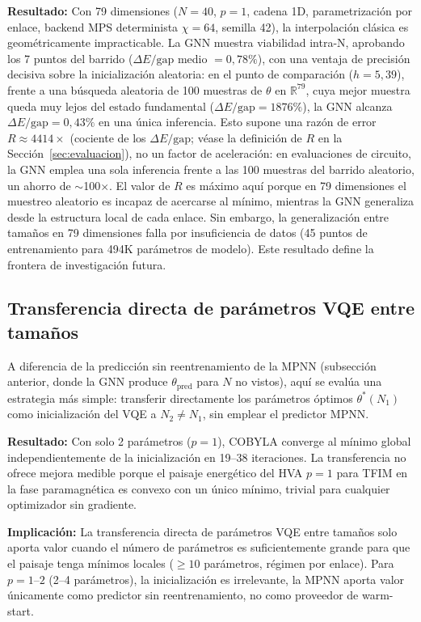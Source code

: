 \documentclass[11pt,a4paper,spanish]{book}
\begin{document}
\textbf{Resultado:} Con 79 dimensiones ($N = 40$, $p = 1$, cadena 1D, parametrización por enlace, backend MPS determinista $\chi = 64$, semilla 42), la interpolación clásica es geométricamente impracticable. La GNN muestra viabilidad intra-N, aprobando los 7 puntos del barrido ($\Delta E/\text{gap}$ medio $= 0,78\%$), con una ventaja de precisión decisiva sobre la inicialización aleatoria: en el punto de comparación ($h = 5,39$), frente a una búsqueda aleatoria de 100 muestras de $\theta$ en $\mathbb{R}^{79}$, cuya mejor muestra queda muy lejos del estado fundamental ($\Delta E/\text{gap} = 1876\%$), la GNN alcanza $\Delta E/\text{gap} = 0,43\%$ en una única inferencia. Esto supone una razón de error $R \approx 4414\times$ (cociente de los $\Delta E/\text{gap}$; véase la definición de $R$ en la Sección~\ref{sec:evaluacion}), no un factor de aceleración: en evaluaciones de circuito, la GNN emplea una sola inferencia frente a las 100 muestras del barrido aleatorio, un ahorro de $\sim$100$\times$. El valor de $R$ es máximo aquí porque en 79 dimensiones el muestreo aleatorio es incapaz de acercarse al mínimo, mientras la GNN generaliza desde la estructura local de cada enlace. Sin embargo, la generalización entre tamaños en 79 dimensiones falla por insuficiencia de datos (45 puntos de entrenamiento para 494K parámetros de modelo). Este resultado define la frontera de investigación futura.

\subsection{Transferencia directa de parámetros VQE entre tamaños}

A diferencia de la predicción sin reentrenamiento de la MPNN (subsección anterior, donde la GNN produce $\theta_{\text{pred}}$ para $N$ no vistos), aquí se evalúa una estrategia más simple: transferir directamente los parámetros óptimos $\theta^*(N_1)$ como inicialización del VQE a $N_2 \neq N_1$, sin emplear el predictor MPNN.

\textbf{Resultado:} Con solo 2 parámetros ($p = 1$), COBYLA \citep{singh2025} converge al mínimo global independientemente de la inicialización en 19--38 iteraciones. La transferencia no ofrece mejora medible porque el paisaje energético del HVA $p = 1$ para TFIM en la fase paramagnética es convexo con un único mínimo, trivial para cualquier optimizador sin gradiente.

\textbf{Implicación:} La transferencia directa de parámetros VQE entre tamaños solo aporta valor cuando el número de parámetros es suficientemente grande para que el paisaje tenga mínimos locales ($\geq 10$ parámetros, régimen por enlace). Para $p = 1$--$2$ (2--4 parámetros), la inicialización es irrelevante, la MPNN aporta valor únicamente como predictor sin reentrenamiento, no como proveedor de warm-start.
\end{document}
